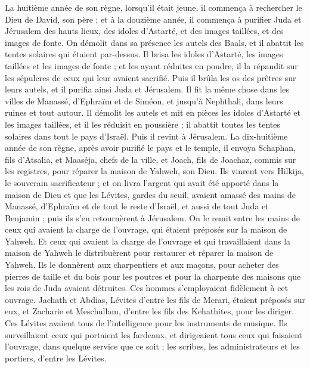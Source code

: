 \begin{multicols}{2}
La huitième année de son règne, lorsqu'il était jeune, il commença à rechercher le Dieu de David, son père ; et à la douzième année, il commença à purifier Juda et Jérusalem des hauts lieux, des idoles d'Astarté, et des images taillées, et des images de fonte.
On démolit dans sa présence les autels des Baals, et il abattit les tentes solaires qui étaient par-dessus. Il brisa les idoles d'Astarté, les images taillées et les images de fonte ; et les ayant réduites en poudre, il la répandit sur les sépulcres de ceux qui leur avaient sacrifié.
Puis il brûla les os des prêtres sur leurs autels, et il purifia ainsi Juda et Jérusalem.
Il fit la même chose dans les villes de Manassé, d'Ephraïm et de Siméon, et jusqu'à Nephthali, dans leurs ruines et tout autour.
Il démolit les autels et mit en pièces les idoles d'Astarté et les images taillées, et il les réduisit en poussière ; il abattit toutes les tentes solaires dans tout le pays d'Israël. Puis il revint à Jérusalem.
La dix-huitième année de son règne, après avoir purifié le pays et le temple, il envoya Schaphan, fils d'Atsalia, et Maaséja, chefs de la ville, et Joach, fils de Joachaz, commis sur les registres, pour réparer la maison de Yahweh, son Dieu.
Ils vinrent vers Hilkija, le souverain sacrificateur ; et on livra l'argent qui avait été apporté dans la maison de Dieu et que les Lévites, gardes du seuil, avaient amassé des mains de Manassé, d'Ephraïm et de tout le reste d'Israël, et aussi de tout Juda et Benjamin ; puis ils s'en retournèrent à Jérusalem.
On le remit entre les mains de ceux qui avaient la charge de l'ouvrage, qui étaient préposés sur la maison de Yahweh. Et ceux qui avaient la charge de l'ouvrage et qui travaillaient dans la maison de Yahweh le distribuèrent pour restaurer et réparer la maison de Yahweh.
Ils le donnèrent aux charpentiers et aux maçons, pour acheter des pierres de taille et du bois pour les poutres et pour la charpente des maisons que les rois de Juda avaient détruites.
Ces hommes s'employaient fidèlement à cet ouvrage. Jachath et Abdias, Lévites d'entre les fils de Merari, étaient préposés sur eux, et Zacharie et Meschullam, d'entre les fils des Kehathites, pour les diriger. Ces Lévites avaient tous de l’intelligence pour les instruments de musique.
Ils surveillaient ceux qui portaient les fardeaux, et dirigeaient tous ceux qui faisaient l'ouvrage, dans quelque service que ce soit ; les scribes, les administrateurs et les portiers, d'entre les Lévites.

\end{multicols}
